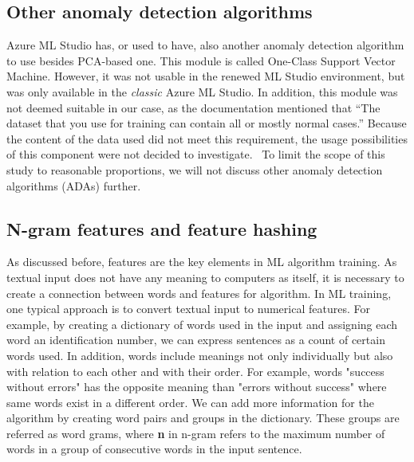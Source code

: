 
\subsection{Other anomaly detection algorithms}\label{bg-other-ada}

Azure ML Studio has,
or used to have,
also another anomaly detection algorithm to use besides PCA-based one.
This module is called One-Class Support Vector Machine.
However,
it was not usable in the renewed ML Studio environment,
but was only available in the \textit{classic} Azure ML Studio.
In addition,
this module was not deemed suitable in our case,
as the documentation mentioned that
\enquote{The dataset that you use for training
can contain all or mostly normal cases.}
Because the content of the data used did not meet this requirement,
the usage possibilities of this component were not decided to investigate.~\cite{azure2021oneclasssvm}
To limit the scope of this study to reasonable proportions,
we will not discuss other anomaly detection algorithms (ADAs) further.


\subsection{N-gram features and feature hashing}\label{subsec:bg-ngram-features-and-hashing}

As discussed before,
features are the key elements in ML algorithm training.
As textual input does not have any meaning to computers as itself,
it is necessary to create a connection between words and features for algorithm.
In ML training,
one typical approach is to convert textual input to numerical features.
For example, by creating a dictionary of words used in the input
and assigning each word an identification number,
we can express sentences as a count of certain words used.
In addition,
words include meanings not only individually but also
with relation to each other and with their order.
For example,
words "success without errors"
has the opposite meaning than "errors without success"
where same words exist in a different order.
We can add more information for the algorithm
by creating word pairs and groups in the dictionary.
These groups are referred as word grams,
where \textbf{n} in n-gram refers to the maximum number of words
in a group of consecutive words in the input sentence.~\cite{furnkranz1998study}

